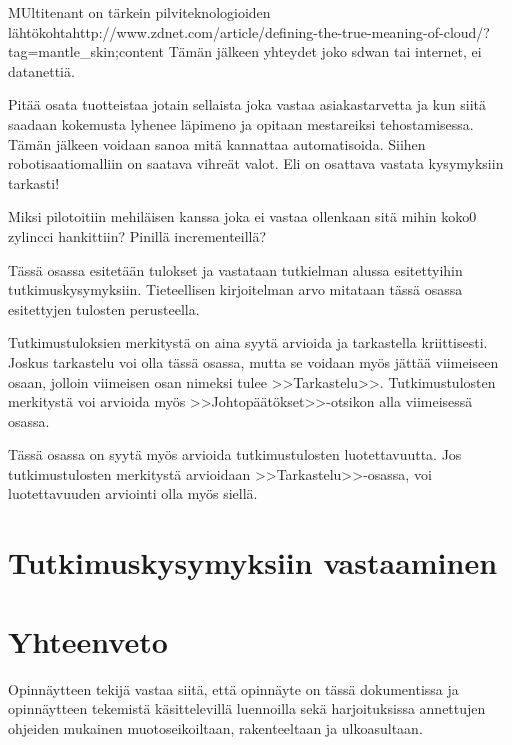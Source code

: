 \documentclass[finnish,12pt,a4paper,pdftex]{article}
\begin{document}
MUltitenant on tärkein pilviteknologioiden lähtökohtahttp://www.zdnet.com/article/defining-the-true-meaning-of-cloud/?tag=mantle_skin;content
Tämän jälkeen yhteydet joko sdwan tai internet, ei datanettiä.

Pitää osata tuotteistaa jotain sellaista joka vastaa asiakastarvetta ja kun siitä saadaan kokemusta lyhenee läpimeno ja opitaan mestareiksi tehostamisessa. Tämän jälkeen voidaan sanoa mitä kannattaa automatisoida. Siihen robotisaatiomalliin on saatava vihreät valot. Eli on osattava vastata kysymyksiin tarkasti!

Miksi pilotoitiin mehiläisen kanssa joka ei vastaa ollenkaan sitä mihin koko0 zylincci hankittiin? Pinillä incrementeillä?

Tässä osassa esitetään tulokset ja vastataan tutkielman alussa
esitettyihin tutkimuskysymyksiin. Tieteellisen kirjoitelman
arvo mitataan tässä osassa esitettyjen tulosten perusteella. 

Tutkimustuloksien merkitystä on aina syytä arvioida ja tarkastella
kriittisesti.  Joskus tarkastelu voi olla tässä osassa, mutta se
voidaan myös jättää viimeiseen osaan, jolloin viimeisen osan nimeksi
tulee >>Tarkastelu>>. Tutkimustulosten merkitystä voi arvioida myös
>>Johtopäätökset>>-otsikon alla viimeisessä osassa. 

Tässä osassa on syytä myös arvioida tutkimustulosten luotettavuutta.
Jos tutkimustulosten merkitystä arvioidaan >>Tarkastelu>>-osassa,
voi luotettavuuden arviointi olla myös siellä. 

\clearpage

\section{Tutkimuskysymyksiin vastaaminen}

\section{Yhteenveto}

Opinnäytteen tekijä vastaa siitä, että opinnäyte on tässä dokumentissa
ja opinnäytteen tekemistä käsittelevillä luennoilla sekä
harjoituksissa annettujen ohjeiden mukainen muotoseikoiltaan,
rakenteeltaan ja ulkoasultaan.
\end{document}
